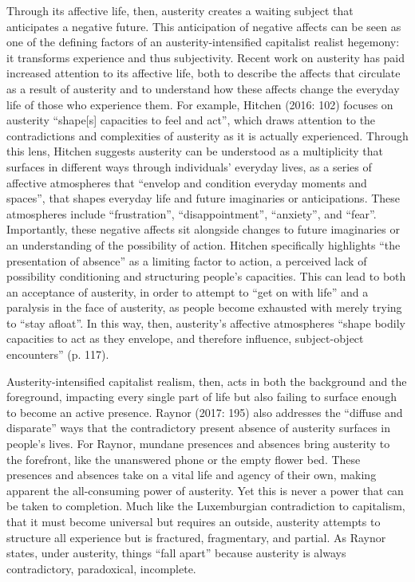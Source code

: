 Through its affective life, then, austerity creates a waiting subject
that anticipates a negative future. This anticipation of negative
affects can be seen as one of the defining factors of an
austerity-intensified capitalist realist hegemony: it transforms
experience and thus subjectivity. Recent work on austerity has paid
increased attention to its affective life, both to describe the affects
that circulate as a result of austerity and to understand how these
affects change the everyday life of those who experience them. For
example, Hitchen (2016: 102) focuses on austerity ``shape{[}s{]}
capacities to feel and act'', which draws attention to the
contradictions and complexities of austerity as it is actually
experienced. Through this lens, Hitchen suggests austerity can be
understood as a multiplicity that surfaces in different ways through
individuals' everyday lives, as a series of affective atmospheres that
``envelop and condition everyday moments and spaces'', that shapes
everyday life and future imaginaries or anticipations. These atmospheres
include ``frustration'', ``disappointment'', ``anxiety'', and ``fear''.
Importantly, these negative affects sit alongside changes to future
imaginaries or an understanding of the possibility of action. Hitchen
specifically highlights ``the presentation of absence'' as a limiting
factor to action, a perceived lack of possibility conditioning and
structuring people's capacities. This can lead to both an acceptance of
austerity, in order to attempt to ``get on with life'' and a paralysis
in the face of austerity, as people become exhausted with merely trying
to ``stay afloat''. In this way, then, austerity's affective atmospheres
``shape bodily capacities to act as they envelope, and therefore
influence, subject-object encounters'' (p. 117).

Austerity-intensified capitalist realism, then, acts in both the
background and the foreground, impacting every single part of life but
also failing to surface enough to become an active presence. Raynor
(2017: 195) also addresses the ``diffuse and disparate'' ways that the
contradictory present absence of austerity surfaces in people's lives.
For Raynor, mundane presences and absences bring austerity to the
forefront, like the unanswered phone or the empty flower bed. These
presences and absences take on a vital life and agency of their own,
making apparent the all-consuming power of austerity. Yet this is never
a power that can be taken to completion. Much like the Luxemburgian
contradiction to capitalism, that it must become universal but requires
an outside, austerity attempts to structure all experience but is
fractured, fragmentary, and partial. As Raynor states, under austerity,
things ``fall apart'' because austerity is always contradictory,
paradoxical, incomplete.

